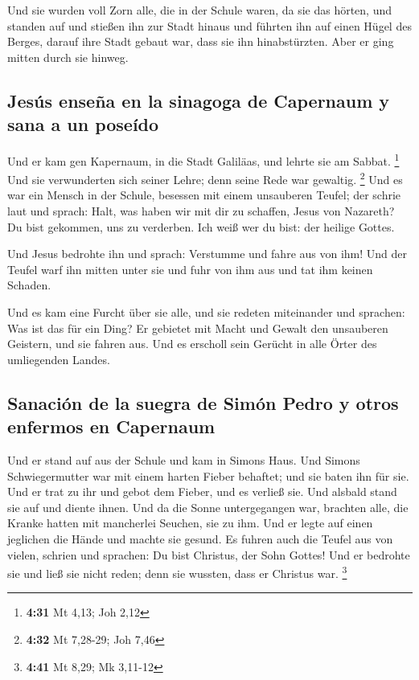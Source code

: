  Und sie wurden voll Zorn alle, die in der Schule waren,
da sie das hörten,  und standen auf und stießen ihn zur
Stadt hinaus und führten ihn auf einen Hügel des Berges, darauf ihre
Stadt gebaut war, dass sie ihn hinabstürzten.  Aber er
ging mitten durch sie hinweg.

\hypertarget{jesuxfas-enseuxf1a-en-la-sinagoga-de-capernaum-y-sana-a-un-poseuxeddo}{%
\subsection{Jesús enseña en la sinagoga de Capernaum y sana a un
poseído}\label{jesuxfas-enseuxf1a-en-la-sinagoga-de-capernaum-y-sana-a-un-poseuxeddo}}

 Und er kam gen Kapernaum, in die Stadt Galiläas, und
lehrte sie am Sabbat. \footnote{\textbf{4:31} Mt 4,13; Joh 2,12}
 Und sie verwunderten sich seiner Lehre; denn seine Rede
war gewaltig. \footnote{\textbf{4:32} Mt 7,28-29; Joh 7,46}
 Und es war ein Mensch in der Schule, besessen mit einem
unsauberen Teufel; der schrie laut  und sprach: Halt, was
haben wir mit dir zu schaffen, Jesus von Nazareth? Du bist gekommen, uns
zu verderben. Ich weiß wer du bist: der heilige Gottes.

 Und Jesus bedrohte ihn und sprach: Verstumme und fahre
aus von ihm! Und der Teufel warf ihn mitten unter sie und fuhr von ihm
aus und tat ihm keinen Schaden.

 Und es kam eine Furcht über sie alle, und sie redeten
miteinander und sprachen: Was ist das für ein Ding? Er gebietet mit
Macht und Gewalt den unsauberen Geistern, und sie fahren aus.
 Und es erscholl sein Gerücht in alle Örter des
umliegenden Landes.

\hypertarget{sanaciuxf3n-de-la-suegra-de-simuxf3n-pedro-y-otros-enfermos-en-capernaum}{%
\subsection{Sanación de la suegra de Simón Pedro y otros enfermos en
Capernaum}\label{sanaciuxf3n-de-la-suegra-de-simuxf3n-pedro-y-otros-enfermos-en-capernaum}}

 Und er stand auf aus der Schule und kam in Simons Haus.
Und Simons Schwiegermutter war mit einem harten Fieber behaftet; und sie
baten ihn für sie.  Und er trat zu ihr und gebot dem
Fieber, und es verließ sie. Und alsbald stand sie auf und diente ihnen.
 Und da die Sonne untergegangen war, brachten alle, die
Kranke hatten mit mancherlei Seuchen, sie zu ihm. Und er legte auf einen
jeglichen die Hände und machte sie gesund.  Es fuhren
auch die Teufel aus von vielen, schrien und sprachen: Du bist Christus,
der Sohn Gottes! Und er bedrohte sie und ließ sie nicht reden; denn sie
wussten, dass er Christus war. \footnote{\textbf{4:41} Mt 8,29; Mk
  3,11-12}

